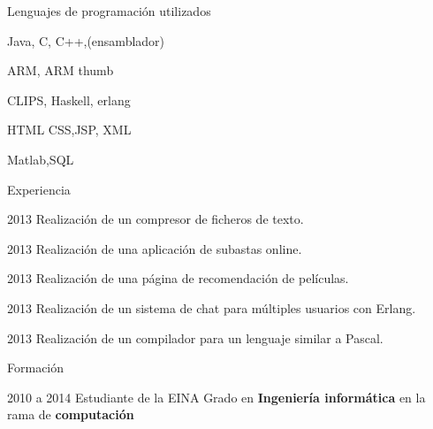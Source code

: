 \begin{cv}{}
\vspace{2em}

\begin{cvlist}{Lenguajes de programación utilizados}
\item Java, C, C++,(ensamblador)
\item ARM, ARM thumb
\item CLIPS, Haskell, erlang
\item HTML CSS,JSP, XML
\item Matlab,SQL
\end{cvlist}

\begin{cvlist}{Experiencia}

	\item[2013] Realización de un compresor de ficheros de texto.
	\item[2013] Realización de una aplicación de subastas online.
	\item[2013] Realización de una página de recomendación de películas.
	\item[2013] Realización de un sistema de chat para múltiples usuarios con Erlang.
	\item[2013] Realización de un compilador para un lenguaje similar a Pascal.
	

\end{cvlist}

\begin{cvlist}{Formación}
	\item[2010 a 2014] Estudiante de la EINA
		Grado en \textbf{Ingeniería informática} en la rama de \textbf{computación}
\end{cvlist}

\end{cv}